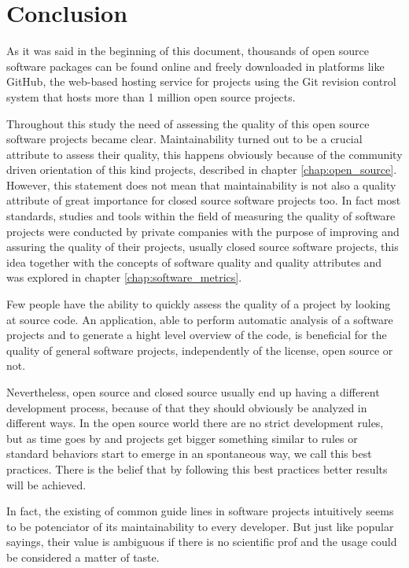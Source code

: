 \thispagestyle{empty}
\chapter{Conclusion}\label{chap:conclusion}


As it was said in the beginning of this document, thousands of open source software packages can be found online and 
freely downloaded in platforms like GitHub,
the web-based hosting service for projects using the Git revision control system that 
hosts more than 1 million open source projects.

Throughout this study the need of assessing the quality of this open source software projects became clear.
Maintainability turned out to be a crucial attribute to assess their quality, 
this happens obviously because of the community driven orientation of this kind projects, 
described in chapter \ref{chap:open_source}. 
However, this statement does not mean that maintainability is not also a quality attribute of great importance
for closed source software projects too. 
In fact most standards, studies and tools within the field of measuring the quality of software projects 
were conducted by private companies with the purpose of improving and assuring the quality of their projects,
usually closed source software projects, this idea together with the concepts of software quality and 
quality attributes and was explored in chapter \ref{chap:software_metrics}.

Few people have the ability to quickly assess the quality of a project by looking at source code. 
An application, able to perform automatic analysis of a software projects and to generate a hight level overview of the code,
is beneficial for the quality of general software projects, independently of the license, open source or not.

Nevertheless, open source and closed source usually end up having a different development process, 
because of that they should obviously be analyzed in different ways.
In the open source world there are no strict development rules, 
but as time goes by and projects get bigger something similar to rules
or standard behaviors start to emerge in an spontaneous way, we call this best practices.
There is the belief that by following this best practices better results will be achieved.

In fact, the existing of common guide lines in software projects intuitively seems to be potenciator of its 
maintainability to every developer.
But just like popular sayings, their value is ambiguous if there is no scientific prof and 
the usage could be considered a matter of taste.

